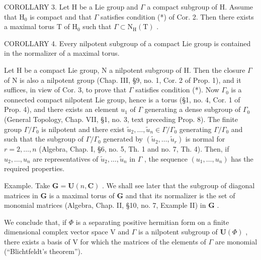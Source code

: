 COROLLARY 3. Let H be a Lie group and \(\Gamma\) a compact subgroup of H. Assume that \(\mathrm{H}_0\) is compact and that \(\Gamma\) satisfies condition (*) of Cor. 2. Then there exists a maximal torus T of \(\mathrm{H}_0\) such that \(\Gamma \subset \mathrm{N}_{\mathrm{H}}(\mathrm{T})\) .

COROLLARY 4. Every nilpotent subgroup of a compact Lie group is contained in the normalizer of a maximal torus.

Let H be a compact Lie group, N a nilpotent subgroup of H. Then the closure \(\varGamma\) of N is also a nilpotent group (Chap. III, §9, no. 1, Cor. 2 of Prop. 1), and it suffices, in view of Cor. 3, to prove that \(\varGamma\) satisfies condition (*). Now \(\varGamma_{0}\) is a connected compact nilpotent Lie group, hence is a torus (§1, no. 4, Cor. 1 of Prop. 4), and there exists an element \(u_{1}\) of \(\varGamma\) generating a dense subgroup of \(\varGamma_{0}\) (General Topology, Chap. VII, §1, no. 3, text preceding Prop. 8). The finite group \(\varGamma/\varGamma_{0}\) is nilpotent and there exist \(\tilde{u}_{2},\ldots,\tilde{u}_{n}\in\varGamma/\varGamma_{0}\) generating \(\varGamma/\varGamma_{0}\) and such that the subgroup of \(\varGamma/\varGamma_{0}\) generated by \((\tilde{u}_{2},\ldots,\tilde{u}_{r})\) is normal for \(r=2,\ldots,n\) (Algebra, Chap. I, §6, no. 5, Th. 1 and no. 7, Th. 4). Then, if \(u_{2},\ldots,u_{n}\) are representatives of \(\tilde{u}_{2},\ldots,\tilde{u}_{n}\) in \(\varGamma\) , the sequence \((u_{1},\ldots,u_{n})\) has the required properties.

Example. Take \(\mathbf{G} = \mathbf{U}(n,\mathbf{C})\) . We shall see later that the subgroup of diagonal matrices in \(\mathbf{G}\) is a maximal torus of \(\mathbf{G}\) and that its normalizer is the set of monomial matrices (Algebra, Chap. II, §10, no. 7, Example II) in \(\mathbf{G}\) .

We conclude that, if \(\Phi\) is a separating positive hermitian form on a finite dimensional complex vector space V and \(\Gamma\) is a nilpotent subgroup of \(\mathbf{U}(\Phi)\) , there exists a basis of V for which the matrices of the elements of \(\Gamma\) are monomial (``Blichtfeldt's theorem'').

